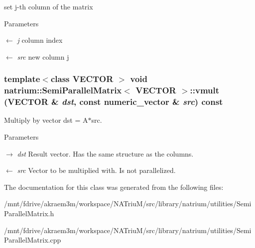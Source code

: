 set j-\/th column of the matrix 
\begin{DoxyParams}{Parameters}
\item[\mbox{$\leftarrow$} {\em j}]column index \item[\mbox{$\leftarrow$} {\em src}]new column j \end{DoxyParams}
\hypertarget{classnatrium_1_1SemiParallelMatrix_a544535d18e218d58541bf4a275ee96b2}{
\subsubsection[{vmult}]{\setlength{\rightskip}{0pt plus 5cm}template$<$class VECTOR $>$ void {\bf natrium::SemiParallelMatrix}$<$ VECTOR $>$::vmult (VECTOR \& {\em dst}, \/  const {\bf numeric\_\-vector} \& {\em src}) const}}
\label{classnatrium_1_1SemiParallelMatrix_a544535d18e218d58541bf4a275ee96b2}


Multiply by vector dst = A$\ast$src. 
\begin{DoxyParams}{Parameters}
\item[\mbox{$\rightarrow$} {\em dst}]Result vector. Has the same structure as the columns. \item[\mbox{$\leftarrow$} {\em src}]Vector to be multiplied with. Is not parallelized. \end{DoxyParams}


The documentation for this class was generated from the following files:\begin{DoxyCompactItemize}
\item 
/mnt/fdrive/akraem3m/workspace/NATriuM/src/library/natrium/utilities/SemiParallelMatrix.h\item 
/mnt/fdrive/akraem3m/workspace/NATriuM/src/library/natrium/utilities/SemiParallelMatrix.cpp\end{DoxyCompactItemize}
